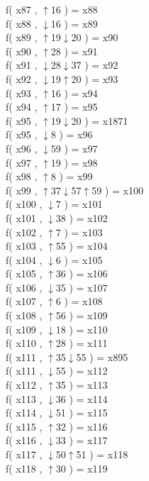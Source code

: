 f( x87 , $\uparrow$16 ) = x88 \\
f( x88 , $\downarrow$16 ) = x89 \\
f( x89 , $\uparrow$19$\downarrow$20 ) = x90 \\
f( x90 , $\uparrow$28 ) = x91 \\
f( x91 , $\downarrow$28$\downarrow$37 ) = x92 \\
f( x92 , $\downarrow$19$\uparrow$20 ) = x93 \\
f( x93 , $\uparrow$16 ) = x94 \\
f( x94 , $\uparrow$17 ) = x95 \\
f( x95 , $\uparrow$19$\downarrow$20 ) = x1871 \\
f( x95 , $\downarrow$8 ) = x96 \\
f( x96 , $\downarrow$59 ) = x97 \\
f( x97 , $\uparrow$19 ) = x98 \\
f( x98 , $\uparrow$8 ) = x99 \\
f( x99 , $\uparrow$37$\downarrow$57$\uparrow$59 ) = x100 \\
f( x100 , $\downarrow$7 ) = x101 \\
f( x101 , $\downarrow$38 ) = x102 \\
f( x102 , $\uparrow$7 ) = x103 \\
f( x103 , $\uparrow$55 ) = x104 \\
f( x104 , $\downarrow$6 ) = x105 \\
f( x105 , $\uparrow$36 ) = x106 \\
f( x106 , $\downarrow$35 ) = x107 \\
f( x107 , $\uparrow$6 ) = x108 \\
f( x108 , $\uparrow$56 ) = x109 \\
f( x109 , $\downarrow$18 ) = x110 \\
f( x110 , $\uparrow$28 ) = x111 \\
f( x111 , $\uparrow$35$\downarrow$55 ) = x895 \\
f( x111 , $\downarrow$55 ) = x112 \\
f( x112 , $\uparrow$35 ) = x113 \\
f( x113 , $\downarrow$36 ) = x114 \\
f( x114 , $\downarrow$51 ) = x115 \\
f( x115 , $\uparrow$32 ) = x116 \\
f( x116 , $\downarrow$33 ) = x117 \\
f( x117 , $\downarrow$50$\uparrow$51 ) = x118 \\
f( x118 , $\uparrow$30 ) = x119 \\

